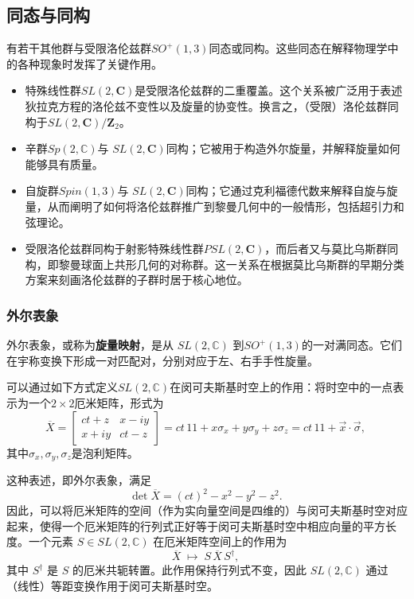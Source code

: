 \subsection{同态与同构}
有若干其他群与受限洛伦兹群$SO^{+}(1,3)$同态或同构。这些同态在解释物理学中的各种现象时发挥了关键作用。
\begin{itemize}
  \item 特殊线性群$SL(2,\mathbf{C})$是受限洛伦兹群的二重覆盖。这个关系被广泛用于表述狄拉克方程的洛伦兹不变性以及旋量的协变性。换言之，（受限）洛伦兹群同构于$SL(2,\mathbf{C}) / \mathbf{Z}_{2}$。
  \item 辛群$Sp(2,\mathbb{C})$与 $SL(2,\mathbf{C})$同构；它被用于构造外尔旋量，并解释旋量如何能够具有质量。
  \item 自旋群$Spin(1,3)$与 $SL(2,\mathbf{C})$同构；它通过克利福德代数来解释自旋与旋量，从而阐明了如何将洛伦兹群推广到黎曼几何中的一般情形，包括超引力和弦理论。
  \item 受限洛伦兹群同构于射影特殊线性群$PSL(2,\mathbf{C})$，而后者又与莫比乌斯群同构，即黎曼球面上共形几何的对称群。这一关系在根据莫比乌斯群的早期分类方案来刻画洛伦兹群的子群时居于核心地位。
\end{itemize}
\subsubsection{外尔表象}
外尔表象，或称为\textbf{旋量映射}，是从 $SL(2,\mathbb{C})$ 到$SO^{+}(1,3)$的一对满同态。它们在宇称变换下形成一对匹配对，分别对应于左、右手手性旋量。

可以通过如下方式定义$SL(2,\mathbb{C})$在闵可夫斯基时空上的作用：将时空中的一点表示为一个$2\times 2$厄米矩阵，形式为
\[
\overline{X} =
\begin{bmatrix}
ct+z & x - i y \\
x + i y & ct - z
\end{bmatrix}
= ct\,1\!\!1 + x\sigma_{x} + y\sigma_{y} + z\sigma_{z}
= ct\,1\!\!1 + \vec{x}\cdot\vec{\sigma},~
\]
其中$\sigma_{x}, \sigma_{y}, \sigma_{z}$是泡利矩阵。

这种表述，即外尔表象，满足
\[
\det \overline{X} = (ct)^{2} - x^{2} - y^{2} - z^{2}.~
\]
因此，可以将厄米矩阵的空间（作为实向量空间是四维的）与闵可夫斯基时空对应起来，使得一个厄米矩阵的行列式正好等于闵可夫斯基时空中相应向量的平方长度。一个元素 $S \in SL(2,\mathbb{C})$ 在厄米矩阵空间上的作用为
\[
\overline{X} \;\mapsto\; S \,\overline{X}\, S^{\dagger},~
\]
其中 $S^{\dagger}$ 是 $S$ 的厄米共轭转置。此作用保持行列式不变，因此 $SL(2,\mathbb{C})$ 通过（线性）等距变换作用于闵可夫斯基时空。

